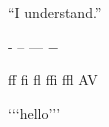 ``I understand.''

- -- --- $-$

ff fi fl ffi ffl AV

\lq\lq\thinspace\lq hello\rq\thinspace\rq\rq

